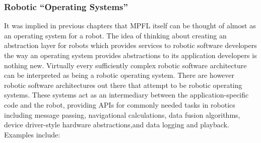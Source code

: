 \subsubsection{Robotic ``Operating Systems''}
It was implied in previous chapters that MPFL itself can be thought of almost as an operating system for a robot. The idea of thinking about creating an abstraction layer for robots which provides services to robotic software developers the way an operating system provides abstractions to its application developers is nothing new. Virtually every sufficiently complex robotic software architecture can be interpreted as being a robotic operating system. There are however robotic software architectures out there that attempt to be robotic operating systems. These systems act as an intermediary between the application-specific code and the robot, providing APIs for commonly needed tasks in robotics including message passing, navigational calculations, data fusion algorithms, device driver-style hardware abstractions,and data logging and playback. Examples include:

